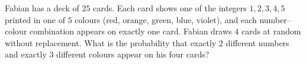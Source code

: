 Fabian has a deck of $25$ cards. Each card shows one of the integers $1,2,3,4,5$ printed in one of $5$ colours (red, orange, green, blue, violet), and each number--colour combination appears on exactly one card. Fabian draws $4$ cards at random without replacement. What is the probability that exactly $2$ different numbers and exactly $3$ different colours appear on his four cards?
